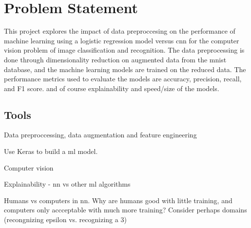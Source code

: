\section{Problem Statement}\label{sec:problem-statement}


This project explores the impact of data preproccesing on the performance of machine learning using a logistic regression model versus \gls{cnn} for the computer vision problem of image classification and recognition. The data preprocessing is done through dimensionality reduction on augmented data from the \gls{mnist} database, and the machine learning models are trained on the reduced data. The performance metrics used to evaluate the models are accuracy, precision, recall, and F1 score. and of course explainability and speed/size of the models.

\subsection{Tools}\label{subsec:tools}
Data preproccessing, data augmentation and feature engineering

Use Keras to build a \gls{ml} model.

Computer vision

Explainability - \gls{nn} vs other \gls{ml} algorithms

Humans vs computers in \gls{nn}. Why are humans good with little training, and computers only accceptable with much more training? Consider perhaps domains (recongnizing epsilon vs. recognizing a 3)

